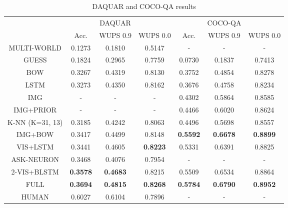 \documentclass{article} \usepackage{nips15submit_e,times}
\renewcommand{\#}[1]{\textbf{#1}}
\begin{document}
\begin{table}[h]
\caption{DAQUAR and COCO-QA results}
\label{tab:daquar_results}
\begin{center}
\begin{small}
\begin{sc}
\begin{tabular}{c | c c c | c c c}
\hline     
                     &          &  DAQUAR  &          &          &  COCO-QA &          \\
                     & Acc.     & WUPS 0.9 & WUPS 0.0 & Acc.     & WUPS 0.9 & WUPS 0.0 \\
\hline         
MULTI-WORLD
\cite{malinowski14b} &  0.1273  &  0.1810  &  0.5147  &  -       &  -       &  -       \\
GUESS                &  0.1824  &  0.2965  &  0.7759  &  0.0730  &  0.1837  &  0.7413  \\
BOW                  &  0.3267  &  0.4319  &  0.8130  &  0.3752  &  0.4854  &  0.8278  \\
LSTM                 &  0.3273  &  0.4350  &  0.8162  &  0.3676  &  0.4758  &  0.8234  \\
IMG                  &  -       &  -       &  -       &  0.4302  &  0.5864  &  0.8585  \\
IMG+PRIOR            &  -       &  -       &  -       &  0.4466  &  0.6020  &  0.8624  \\
K-NN (K=31, 13)      &  0.3185  &  0.4242  &  0.8063  &  0.4496  &  0.5698  &  0.8557  \\
IMG+BOW              &  0.3417  &  0.4499  &  0.8148  &\#{0.5592}&\#{0.6678}&\#{0.8899}\\
VIS+LSTM             &  0.3441  &  0.4605  &\#{0.8223}&  0.5331  &  0.6391  & 0.8825   \\
ASK-NEURON
\cite{malinowski15}  &  0.3468  &  0.4076  & 0.7954   &  -       &  -       &  -       \\
2-VIS+BLSTM          &\#{0.3578}&\#{0.4683}& 0.8215   &  0.5509  &  0.6534  & 0.8864   \\
FULL                 &\#{0.3694}&\#{0.4815}&\#{0.8268}&\#{0.5784}&\#{0.6790}&\#{0.8952}\\
\hline
HUMAN                &  0.6027  &  0.6104  &  0.7896  &  -       &  -       &  -       \\
\hline
\end{tabular}
\end{sc}
\end{small}
\end{center}
\end{table}
\end{document}
